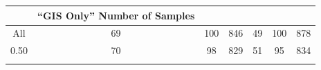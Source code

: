 \documentclass[11pt,]{article}
\begin{document}
\begin{longtable}[c]{@{}ccccccc@{}}
\begin{minipage}[b]{0.13\columnwidth}
\strut\end{minipage} &
\begin{minipage}[b]{0.13\columnwidth}\centering\strut
``GIS Only'' Number of Samples
\strut\end{minipage}\tabularnewline
\midrule
\endhead
\begin{minipage}[t]{0.08\columnwidth}\centering\strut
All
\strut\end{minipage} &
\begin{minipage}[t]{0.11\columnwidth}\centering\strut
69
\strut\end{minipage} &
\begin{minipage}[t]{0.13\columnwidth}\centering\strut
100
\strut\end{minipage} &
\begin{minipage}[t]{0.13\columnwidth}\centering\strut
846
\strut\end{minipage} &
\begin{minipage}[t]{0.11\columnwidth}\centering\strut
49
\strut\end{minipage} &
\begin{minipage}[t]{0.13\columnwidth}\centering\strut
100
\strut\end{minipage} &
\begin{minipage}[t]{0.13\columnwidth}\centering\strut
878
\strut\end{minipage}\tabularnewline
\begin{minipage}[t]{0.08\columnwidth}\centering\strut
0.50
\strut\end{minipage} &
\begin{minipage}[t]{0.11\columnwidth}\centering\strut
70
\strut\end{minipage} &
\begin{minipage}[t]{0.13\columnwidth}\centering\strut
98
\strut\end{minipage} &
\begin{minipage}[t]{0.13\columnwidth}\centering\strut
829
\strut\end{minipage} &
\begin{minipage}[t]{0.11\columnwidth}\centering\strut
51
\strut\end{minipage} &
\begin{minipage}[t]{0.13\columnwidth}\centering\strut
95
\strut\end{minipage} &
\begin{minipage}[t]{0.13\columnwidth}\centering\strut
834
\strut\end{minipage}\tabularnewline
\begin{minipage}[t]{0.08\columnwidth}\centering\strut

\end{minipage}
\end{longtable}
\end{document}
